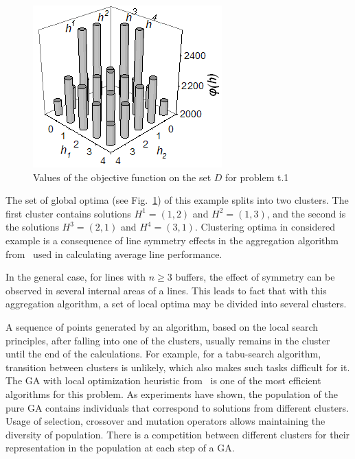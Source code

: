\documentclass{ifacconf}
\begin{document}
 \begin{figure}[h!]
	\centering
	\includegraphics[scale=0.7]{test}
  \caption{Values of the objective function on the set $D$ for problem t.1\label{t_1}}
  \end{figure}

The set of global optima (see Fig.~\ref{t_1}) of this example splits into two clusters. The
first cluster contains solutions $H^1=(1,2)$ and $H^2=(1,3)$, and
the second is the solutions $H^3=(2,1)$ and $H^4=(3,1)$. Clustering optima in
considered example is a consequence of line symmetry effects
in the aggregation algorithm from~\cite{Dolgui93} used in calculating average
line performance.

In the general case, for lines with $n\geq 3$ buffers, the effect of
symmetry can be observed in several internal areas of a
lines. This leads to fact that with this aggregation algorithm, a
set of local optima may be divided into several clusters.

A sequence of points generated by an algorithm, based on the local search principles, after falling into one of the clusters, usually
 remains in the cluster until the end of the calculations. For example, for a tabu-search algorithm, transition between clusters is unlikely, which also makes
such tasks difficult for it. 
The GA with local optimization heuristic from~\cite{sHBBA2007} is one of the most efficient algorithms for this problem. 
As experiments have shown, the population of the pure GA contains individuals that correspond to solutions from different clusters. 
Usage of selection, crossover and mutation operators allows maintaining the diversity of population.
There is a competition between different clusters for their representation in the population at each step of a GA.
\end{document}
